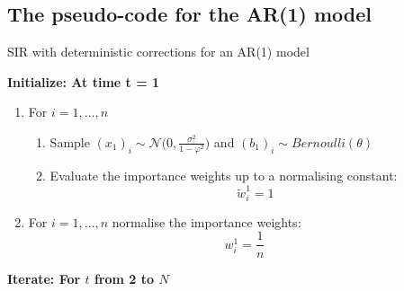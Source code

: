 \subsection{The pseudo-code for the AR(1) model}

\begin{algorithm}[H]
\caption{SIR with deterministic corrections for an AR(1) model}\label{euclid}
 \begin{algorithmic}

 \State  \bf{Initialize:} \normalfont At time t = 1
            
\begin{enumerate}
	\item For $i = 1, \dots , n$
	\begin{enumerate}
		\item Sample $(x_{1})_i \sim \mathcal{N} \Bigg (0, \frac{\sigma^2}{1- \varphi^2} \Bigg)$ and $(b_1)_i \sim Bernoulli(\theta)$
		\item Evaluate the importance weights up to a normalising constant:
		\[
		\tilde{w}^{1}_{i} = 1
		\]
	\end{enumerate}
	\item For $i = 1, \dots , n$ normalise the importance weights: 
	\[
	w^{1}_{i} = \frac{1}{n}
	\]
\end{enumerate}

 \State  \bf{Iterate:} \normalfont For $t$ from 2 to $N$


\end{algorithmic}
\end{algorithm}
